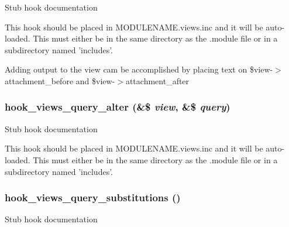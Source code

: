 Stub hook documentation

This hook should be placed in MODULENAME.views.inc and it will be auto-loaded. This must either be in the same directory as the .module file or in a subdirectory named 'includes'.

Adding output to the view cam be accomplished by placing text on \$view-$>$attachment\_\-before and \$view-$>$attachment\_\-after 
\subsubsection{\setlength{\rightskip}{0pt plus 5cm}hook\_\-views\_\-query\_\-alter (\&\$ {\em view}, \&\$ {\em query})}\label{group__views__hooks_gf4d538493930fe0fa0ce6fb3bf42c156}


Stub hook documentation

This hook should be placed in MODULENAME.views.inc and it will be auto-loaded. This must either be in the same directory as the .module file or in a subdirectory named 'includes'. 
\subsubsection{\setlength{\rightskip}{0pt plus 5cm}hook\_\-views\_\-query\_\-substitutions ()}\label{group__views__hooks_g2a2f60cadfec300b51a4960080ef8ac5}


Stub hook documentation 